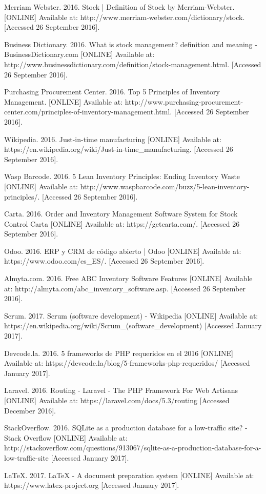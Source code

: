 \begin{thebibliography}{9}

Merriam Webster. 2016. Stock | Definition of Stock by Merriam-Webster. [ONLINE] Available at: http://www.merriam-webster.com/dictionary/stock. [Accessed 26 September 2016].

Business Dictionary. 2016. What is stock management? definition and meaning - BusinessDictionary.com [ONLINE] Available at: http://www.businessdictionary.com/definition/stock-management.html. [Accessed 26 September 2016].

Purchasing Procurement Center. 2016. Top 5 Principles of Inventory Management. [ONLINE] Available at: http://www.purchasing-procurement-center.com/principles-of-inventory-management.html. [Accessed 26 September 2016].

Wikipedia. 2016. Just-in-time manufacturing [ONLINE] Available at: https://en.wikipedia.org/wiki/Just-in-time\_manufacturing. [Accessed 26 September 2016].

Wasp Barcode. 2016. 5 Lean Inventory Principles: Ending Inventory Waste [ONLINE] Available at: http://www.waspbarcode.com/buzz/5-lean-inventory-principles/. [Accessed 26 September 2016].

Carta. 2016. Order and Inventory Management Software System for Stock Control Carta [ONLINE] Available at: https://getcarta.com/. [Accessed 26 September 2016].

Odoo. 2016. ERP y CRM de código abierto | Odoo [ONLINE] Available at: https://www.odoo.com/es\_ES/. [Accessed 26 September 2016].

Almyta.com. 2016. Free ABC Inventory Software Features [ONLINE] Available at: http://almyta.com/abc\_inventory\_software.asp. [Accessed 26 September 2016].

Scrum. 2017. Scrum (software development) - Wikipedia [ONLINE] Available at: https://en.wikipedia.org/wiki/Scrum\_(software\_development) [Accessed January 2017].

Devcode.la. 2016. 5 frameworks de PHP requeridos en el 2016 [ONLINE] Available at: https://devcode.la/blog/5-frameworks-php-requeridos/ [Accessed January 2017].

Laravel. 2016. Routing - Laravel - The PHP Framework For Web Artisans [ONLINE] Available at: https://laravel.com/docs/5.3/routing [Accessed December 2016].

StackOverflow. 2016. SQLite as a production database for a low-traffic site? - Stack Overflow [ONLINE] Available at: http://stackoverflow.com/questions/913067/sqlite-as-a-production-database-for-a-low-traffic-site [Accessed January 2017].

LaTeX. 2017. LaTeX - A document preparation system [ONLINE] Available at: https://www.latex-project.org [Accessed January 2017].

\end{thebibliography}